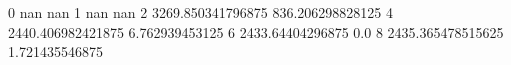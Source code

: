 0 nan nan
1 nan nan
2 3269.850341796875 836.206298828125
4 2440.406982421875 6.762939453125
6 2433.64404296875 0.0
8 2435.365478515625 1.721435546875
